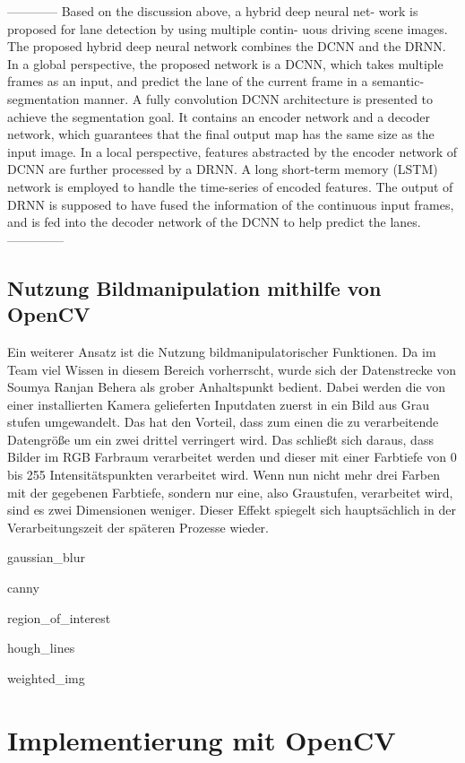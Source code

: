 ------------
Based on the discussion above, a hybrid deep neural net- work is proposed for lane detection by using multiple contin- uous driving scene images. The proposed hybrid deep neural network combines the DCNN and the DRNN. In a global perspective, the proposed network is a DCNN, which takes multiple frames as an input, and predict the lane of the current frame in a semantic-segmentation manner. A fully convolution DCNN architecture is presented to achieve the segmentation goal. It contains an encoder network and a decoder network, which guarantees that the final output map has the same size as the input image. In a local perspective, features abstracted by the encoder network of DCNN are further processed by a DRNN. A long short-term memory (LSTM) network is employed to handle the time-series of encoded features. The output of DRNN is supposed to have fused the information of the continuous input frames, and is fed into the decoder network of the DCNN to help predict the lanes.
--------------


\subsection{Nutzung Bildmanipulation mithilfe von OpenCV}

Ein weiterer Ansatz ist die Nutzung bildmanipulatorischer Funktionen. Da im Team viel Wissen in diesem Bereich vorherrscht, wurde sich der Datenstrecke von Soumya Ranjan Behera \cite{behera_2019} als grober Anhaltspunkt bedient.
Dabei werden die von einer installierten Kamera gelieferten Inputdaten zuerst in ein Bild aus Grau stufen umgewandelt. Das hat den Vorteil, dass zum einen die zu verarbeitende Datengröße um ein zwei drittel verringert wird. Das schließt sich daraus, dass Bilder im \ac{RGB} Farbraum verarbeitet werden und dieser mit einer Farbtiefe von 0 bis 255 Intensitätspunkten verarbeitet wird. Wenn nun nicht mehr drei Farben mit der gegebenen Farbtiefe, sondern nur eine, also Graustufen, verarbeitet wird, sind es zwei Dimensionen weniger. Dieser Effekt spiegelt sich hauptsächlich in der Verarbeitungszeit der späteren Prozesse wieder.

gaussian_blur

canny

region_of_interest

hough_lines

weighted_img



\section{Implementierung mit OpenCV} %


